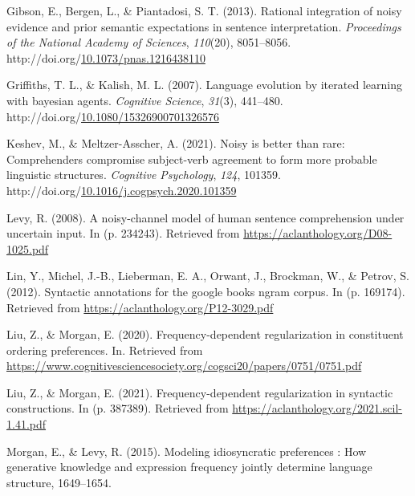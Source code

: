 \documentclass[10pt, letterpaper]{article}
\newenvironment{CSLReferences}%
  {}%
  {\par}
\begin{document}
\begin{CSLReferences}{1}{0}
\leavevmode{}%
Gibson, E., Bergen, L., \& Piantadosi, S. T. (2013). Rational
integration of noisy evidence and prior semantic expectations in
sentence interpretation. \emph{Proceedings of the National Academy of
Sciences}, \emph{110}(20), 8051--8056.
http://doi.org/\href{https://doi.org/10.1073/pnas.1216438110}{10.1073/pnas.1216438110}

\leavevmode{}%
Griffiths, T. L., \& Kalish, M. L. (2007). Language evolution by
iterated learning with bayesian agents. \emph{Cognitive Science},
\emph{31}(3), 441--480.
http://doi.org/\href{https://doi.org/10.1080/15326900701326576}{10.1080/15326900701326576}

\leavevmode{}%
Keshev, M., \& Meltzer-Asscher, A. (2021). Noisy is better than rare:
Comprehenders compromise subject-verb agreement to form more probable
linguistic structures. \emph{Cognitive Psychology}, \emph{124}, 101359.
http://doi.org/\href{https://doi.org/10.1016/j.cogpsych.2020.101359}{10.1016/j.cogpsych.2020.101359}

\leavevmode{}%
Levy, R. (2008). A noisy-channel model of human sentence comprehension
under uncertain input. In (p. 234243). Retrieved from
\url{https://aclanthology.org/D08-1025.pdf}

\leavevmode{}%
Lin, Y., Michel, J.-B., Lieberman, E. A., Orwant, J., Brockman, W., \&
Petrov, S. (2012). Syntactic annotations for the google books ngram
corpus. In (p. 169174). Retrieved from
\url{https://aclanthology.org/P12-3029.pdf}

\leavevmode{}%
Liu, Z., \& Morgan, E. (2020). Frequency-dependent regularization in
constituent ordering preferences. In. Retrieved from
\url{https://www.cognitivesciencesociety.org/cogsci20/papers/0751/0751.pdf}

\leavevmode{}%
Liu, Z., \& Morgan, E. (2021). Frequency-dependent regularization in
syntactic constructions. In (p. 387389). Retrieved from
\url{https://aclanthology.org/2021.scil-1.41.pdf}

\leavevmode{}%
Morgan, E., \& Levy, R. (2015). Modeling idiosyncratic preferences : How
generative knowledge and expression frequency jointly determine language
structure, 1649--1654.


\end{CSLReferences}
\end{document}
